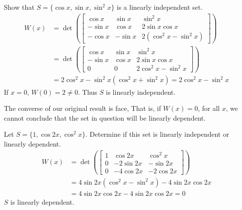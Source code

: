\documentclass[12pt]{article}
\begin{document}
\begin{example} Show that $S = \{ \cos{x}, \sin{x}, \sin^2{x}\}$ is a linearly independent set. 
$$ \begin{aligned} W(x) &= \det(\begin{bmatrix} \cos{x} & \sin{x} & \sin^2{x} \\ -\sin{x} & \cos{x} & 2\sin{x}\cos{x} \\ -\cos{x} & -\sin{x} & 2(\cos^2{x} - \sin^2{x}) \end{bmatrix}) \\ &= \det(\begin{bmatrix} \cos{x} & \sin{x} & \sin^2{x} \\ -\sin{x} & \cos{x} & 2\sin{x}\cos{x} \\ 0 & 0 & 2\cos^2{x} - \sin^2{x} \end{bmatrix}) \\ &= 2\cos^2{x} - \sin^2{x}(\cos^2{x} + \sin^2{x}) = 2\cos^2{x} - \sin^2{x} \end{aligned} $$ If $x = 0$, $W(0) = 2 \neq 0$. Thus $S$ is linearly independent. \end{example} 
The converse of our original result is face, That is, if $W(x) = 0$, for all $x$, we cannot conclude that the set in question will be linearly dependent. 
\begin{example} Let $S = \{1, \cos{2x}, \cos^2{x}\}$. Determine if this set is linearly independent or linearly dependent. $$\begin{aligned} W(x) &= \det(\begin{bmatrix} 1 & \cos{2x} & \cos^2{x} \\ 0 & -2\sin{2x} & -\sin{2x} \\ 0 & -4\cos{2x} & -2\cos{2x} \end{bmatrix}) \\ &= 4\sin{2x}(\cos^2{x} - \sin^2{x}) - 4\sin{2x}\cos{2x} \\ &= 4\sin{2x}\cos{2x} - 4\sin{2x}\cos{2x} = 0 \end{aligned} $$ $S$ is linearly dependent. \end{example}
\end{document}
